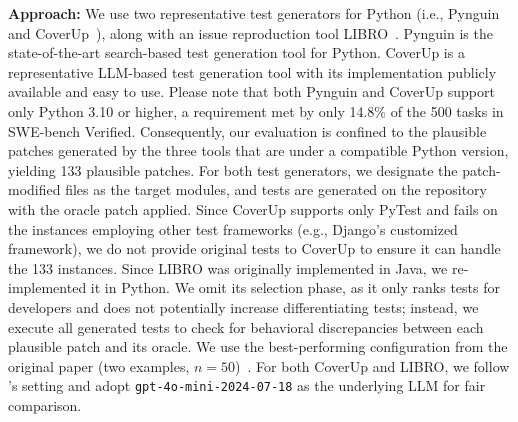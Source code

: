 \noindent\textbf{Approach:} We use two representative test generators for Python (i.e., Pynguin~\cite{lukasczyk2022pynguin} and CoverUp~\cite{pizzorno2024coverup}), 
along with an issue reproduction tool LIBRO~\cite{kang2024evaluating}.
Pynguin is the state-of-the-art search-based test generation tool for Python.
CoverUp is a representative LLM-based test generation tool with its implementation publicly available and easy to use.
Please note that both Pynguin and CoverUp support only Python 3.10 or higher, a requirement met by only 14.8\% of the 500 tasks in SWE-bench Verified.
Consequently, our evaluation is confined to the plausible patches generated by the three tools that are under a compatible Python version, yielding 133 plausible patches.
For both test generators, we designate the patch-modified files as the target modules, and tests are generated on the repository with the oracle patch applied. 
%
Since CoverUp supports only PyTest and fails on the instances employing other test frameworks (e.g., Django’s customized framework), we do not provide original tests to CoverUp to ensure it can handle the 133 instances.
Since LIBRO was originally implemented in Java, we re-implemented it in Python. 
We omit its selection phase, as it only ranks tests for developers and does not potentially increase differentiating tests; 
instead, we execute all generated tests to check for behavioral discrepancies between each plausible patch and its oracle. 
We use the best-performing configuration from the original paper (two examples, $n=50$)~\cite{kang2024evaluating}. 
For both CoverUp and LIBRO, we follow \appname’s setting and adopt \texttt{gpt-4o-mini-2024-07-18} as the underlying LLM for fair comparison.



